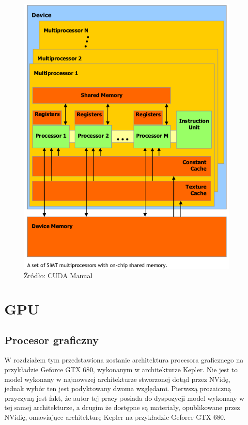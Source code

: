 \begin{figure}[H]
\centering
\includegraphics[scale=0.8]{images/gpu.png}
\caption{Źródło: CUDA Manual}
\end{figure}

\section{GPU}
\subsection{Procesor graficzny}

W rozdziałem tym przedstawiona zostanie architektura procesora graficznego na
przykładzie Geforce GTX 680, wykonanym w architekturze Kepler. Nie jest to model
wykonany w najnowszej architekturze stworzonej dotąd przez NVidę, jednak wybór
ten jest podyktowany dwoma względami. Pierwszą prozaiczną przyczyną jest fakt,
	że autor tej pracy posiada do dyspozycji model wykonany w tej samej
	architekturze, a drugim że dostępne są materiały, opublikowane przez NVidię,
	omawiające architekturę Kepler na przykładzie Geforce GTX 680.

